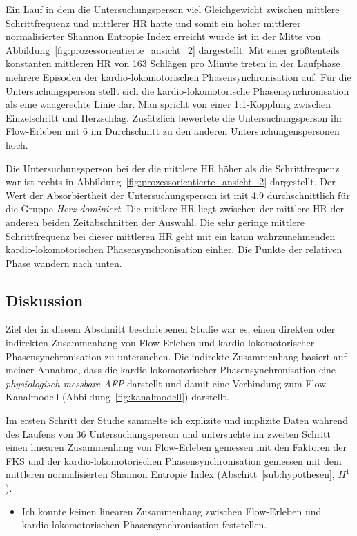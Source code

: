 Ein Lauf in dem die Untersuchungsperson viel Gleichgewicht zwischen mittlere Schrittfrequenz und mittlerer HR hatte und somit ein hoher mittlerer normalisierter Shannon Entropie Index erreicht wurde ist in der Mitte von Abbildung~\ref{fig:prozessorientierte_ansicht_2} dargestellt. Mit einer größtenteils konstanten mittleren HR von 163 Schlägen pro Minute treten in der Laufphase mehrere Episoden der kardio-lokomotorischen Phasensynchronisation auf. Für die Untersuchungsperson stellt sich die kardio-lokomotorische Phasensynchronisation als eine waagerechte Linie dar. Man spricht von einer 1:1-Kopplung zwischen Einzelschritt und Herzschlag. Zusätzlich bewertete die Untersuchungsperson ihr Flow-Erleben mit 6 im Durchschnitt zu den anderen Untersuchungenspersonen hoch. 

Die Untersuchungsperson bei der die mittlere HR höher als die Schrittfrequenz war ist rechts in Abbildung~\ref{fig:prozessorientierte_ansicht_2} dargestellt. Der Wert der Absorbiertheit der Untersuchungsperson ist mit 4,9 durchschnittlich für die Gruppe \emph{Herz dominiert}. Die mittlere HR liegt zwischen der mittlere HR der anderen beiden Zeitabschnitten der Auswahl. Die sehr geringe mittlere Schrittfrequenz bei dieser mittleren HR geht mit ein kaum wahrzunehmenden kardio-lokomotorischen Phasensynchronisation einher. Die Punkte der relativen Phase wandern nach unten. 

\subsection{Diskussion} 

\label{sub:diskussion_5_3}

Ziel der in diesem Abschnitt beschriebenen Studie war es, einen direkten oder indirekten Zusammenhang von Flow-Erleben und kardio-lokomotorischer Phasensynchronisation zu untersuchen. Die indirekte Zusammenhang basiert auf meiner Annahme, dass die kardio-lokomotorischer Phasensynchronisation eine \emph{physiologisch messbare \ac{AFP}} darstellt und damit eine Verbindung zum Flow-Kanalmodell (Abbildung~\ref{fig:kanalmodell}) darstellt. 

Im ersten Schritt der Studie sammelte ich explizite und implizite Daten während des Laufens von 36 Untersuchungsperson und untersuchte im zweiten Schritt einen linearen Zusammenhang von Flow-Erleben gemessen mit den Faktoren der \ac{FKS} und der kardio-lokomotorischen Phasensynchronisation gemessen mit dem mittleren normalisierten Shannon Entropie Index (Abschitt~\ref{sub:hypothesen}, $H^1$). 
\begin{itemize}
	
	\item Ich konnte keinen linearen Zusammenhang zwischen Flow-Erleben und kardio-lokomotorischen Phasensynchronisation feststellen.
\end{itemize}

